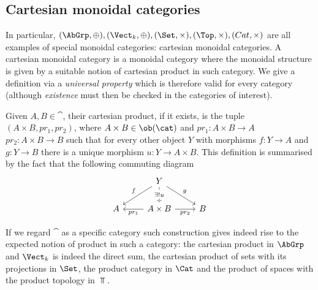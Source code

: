 \subsection{Cartesian monoidal categories \extra} 
\label{sub:cartesian_categories}

In particular,
 $(\AbGrp, \oplus), (\Vect_k, \oplus), (\Set, \times), (\Top, \times), (Cat, \times)$ are all examples of special monoidal categories: cartesian monoidal categories. A cartesian monoidal category is a monoidal category where the monoidal structure is given by a suitable notion of cartesian product in such category. We give a definition via a \textit{universal property} which is therefore valid for every category (although \textit{existence} must then be checked in the categories of interest).
\begin{defn}\label{CartProd}
    Given $A,B\in\cat$, their cartesian product, if it exists, is the tuple $(A\times B,pr_1,pr_2)$, where $A\times B\in \ob(\cat)$ and $pr_1:A\times B\to A$  $pr_2:A\times B\to B$ such that for every other object $Y$ with morphisms $f:Y\to A$ and $g:Y\to B$ there is a unique morphism $u:Y\to A\times B$. This definition is summarised by the fact that the following commuting diagram 
\[\begin{tikzcd}
    {} & Y \\
    A & {A\times B} & B
    \arrow["g", from=1-2, to=2-3]
    \arrow["{pr_1}", from=2-2, to=2-1]
    \arrow["f"', from=1-2, to=2-1]
    \arrow["{pr_2}"', from=2-2, to=2-3]
    \arrow["{\exists! u}"{description}, dashed, from=1-2, to=2-2]
\end{tikzcd}\]
\end{defn}
\noindent If we regard $\cat$ as a specific category such construction gives indeed rise to the expected notion of product in such a category: the cartesian product in $\AbGrp$ and $\Vect_k$ is indeed the direct sum, the cartesian product of sets with its projections in $\Set$, the product category in $\Cat$ and the product of spaces with the product topology in $\Top$. 


